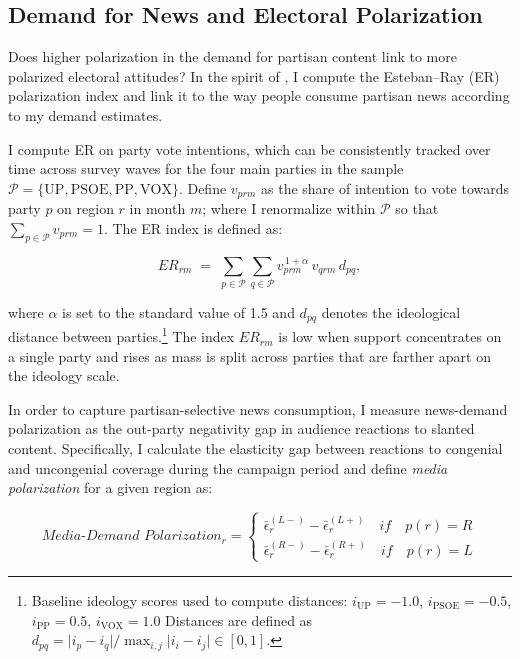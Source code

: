 \documentclass[12pt]{article}
\begin{document}
	\subsection{Demand for News and Electoral Polarization}
	
	
	

Does higher polarization in the demand for partisan content link to more polarized electoral attitudes?  In the spirit of \cite{martin2017}, I 
compute the Esteban–Ray (ER) polarization index and link it to the way people consume partisan news according to my demand estimates.

I compute ER on party vote intentions, which can be consistently tracked over time across survey waves  for the four main parties in the sample $\mathcal{P}=\{\mathrm{UP},\mathrm{PSOE},\mathrm{PP},\mathrm{VOX}\}$. Define $v_{prm}$ as the share of intention to vote towards party $p$ on region $r$ in month $m$; where I renormalize within $\mathcal{P}$ so that $\sum_{p\in\mathcal{P}} v_{prm}=1$. The ER index is defined as: 

\begin{equation}
	ER_{rm} \;=\; 
	\displaystyle\sum_{p\in\mathcal{P}} \sum_{q\in\mathcal{P}} 
	v_{prm}^{\,1+\alpha}\, v_{qrm}\, d_{pq},
		\label{eq:er}
\end{equation}


where $\alpha$ is set to the standard value of 1.5 and $d_{pq}$ denotes the  ideological distance between parties.\footnote{Baseline ideology scores used to compute distances: $i_{\mathrm{UP}}=-1.0$, $i_{\mathrm{PSOE}}=-0.5$, $i_{\mathrm{PP}}=0.5$, $i_{\mathrm{VOX}}=1.0$ Distances are defined as $d_{pq}=\lvert i_p-i_q\rvert/\max_{i,j}\lvert i_i-i_j\rvert \in [0,1]$.} The index $ER_{rm}$ is low when support concentrates on a single party and rises as mass is split across parties that are farther apart on the ideology scale.

	
In order to capture partisan-selective news consumption, I measure  news-demand polarization as the out-party negativity gap in audience reactions to slanted content. Specifically, I calculate the elasticity gap between reactions to congenial and uncongenial coverage during the campaign period and define \textit{media polarization} for a given region as: 
	
	
	\begin{equation}
		\textit{Media-Demand Polarization}_r  =	\begin{cases}
			\bar{\epsilon}_r^{(L-)}- \bar{\epsilon}_r^{(L+)} \quad if \quad p(r)=R\\
			\bar{\epsilon}_r^{(R-)}- \bar{\epsilon}_r^{(R+)} \quad if \quad p(r)=L
		\end{cases}
		\label{eq:mediapol}
	\end{equation}
	
\end{document}
